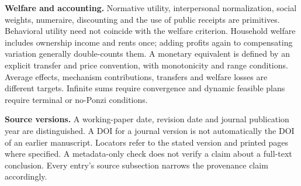 \documentclass[11pt,a4paper]{article}
\begin{document}
\textbf{Welfare and accounting.} Normative utility, interpersonal normalization, social weights, numeraire, discounting and the use of public receipts are primitives. Behavioral utility need not coincide with the welfare criterion. Household welfare includes ownership income and rents once; adding profits again to compensating variation generally double-counts them. A monetary equivalent is defined by an explicit transfer and price convention, with monotonicity and range conditions. Average effects, mechanism contributions, transfers and welfare losses are different targets. Infinite sums require convergence and dynamic feasible plans require terminal or no-Ponzi conditions.

\textbf{Source versions.} A working-paper date, revision date and journal publication year are distinguished. A DOI for a journal version is not automatically the DOI of an earlier manuscript. Locators refer to the stated version and printed pages where specified. A metadata-only check does not verify a claim about a full-text conclusion. Every entry's source subsection narrows the provenance claim accordingly.
\end{document}
